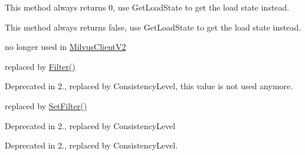 \begin{DoxyRefList}
%
This method always returns 0, use Get\+Load\+State to get the load state instead.  
\item[Member \mbox{\hyperlink{classmilvus_1_1_partition_info_ae104eecfb6d501a19e77ff1ee3e28e5d}{milvus\+::Partition\+Info\+::Loaded}} () const]\label{deprecated__deprecated000019}%
%
This method always returns false, use Get\+Load\+State to get the load state instead.  
\item[Class \mbox{\hyperlink{structmilvus_1_1_progress}{milvus\+::Progress}} ]\label{deprecated__deprecated000020}%
%
no longer used in \mbox{\hyperlink{classmilvus_1_1_milvus_client_v2}{Milvus\+Client\+V2}}  
\item[Member \mbox{\hyperlink{classmilvus_1_1_query_arguments_a8206f1a9e636a9f4e518424d9dfe48c2}{milvus\+::Query\+Arguments\+::Expression}} () const]\label{deprecated__deprecated000021}%
%
replaced by \mbox{\hyperlink{classmilvus_1_1_query_arguments_a7ba8cc33b4b2b4311820eee344c5d880}{Filter()}}  
\item[Member \mbox{\hyperlink{classmilvus_1_1_query_arguments_a12d32edef32435204f9be016296f4246}{milvus\+::Query\+Arguments\+::Guarantee\+Timestamp}} () const]\label{deprecated__deprecated000025}%
%
Deprecated in 2., replaced by Consistency\+Level, this value is not used anymore.  
\item[Member \mbox{\hyperlink{classmilvus_1_1_query_arguments_a09f543774bc107024420439e0715955b}{milvus\+::Query\+Arguments\+::Set\+Expression}} (std\+::string expression)]\label{deprecated__deprecated000022}%
%
replaced by \mbox{\hyperlink{classmilvus_1_1_query_arguments_a4c1df480d0da5d76954feaa43b33bee9}{Set\+Filter()}}  
\item[Member \mbox{\hyperlink{classmilvus_1_1_query_arguments_a027873a6b8008516c638838698dbb81d}{milvus\+::Query\+Arguments\+::Set\+Guarantee\+Timestamp}} (uint64\+\_\+t timestamp)]\label{deprecated__deprecated000026}%
%
Deprecated in 2., replaced by Consistency\+Level  
\item[Member \mbox{\hyperlink{classmilvus_1_1_query_arguments_a114498bb746857299e37e2e6e3867536}{milvus\+::Query\+Arguments\+::Set\+Travel\+Timestamp}} (uint64\+\_\+t timestamp)]\label{deprecated__deprecated000024}%
%
Deprecated in 2., replaced by Consistency\+Level.  

\end{DoxyRefList}
